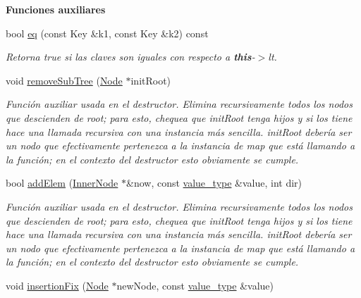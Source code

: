 \begin{Indent}{\bf Funciones auxiliares}\par
\begin{DoxyCompactItemize}
\item 
bool \hyperlink{classaed2_1_1map_ab45cb28bb215cd229383d88b96b3f624_ab45cb28bb215cd229383d88b96b3f624}{eq} (const Key \&k1, const Key \&k2) const 
\begin{DoxyCompactList}\small\item\em Retorna true si las claves son iguales con respecto a {\bfseries this}-\/$>$lt. \end{DoxyCompactList}\item 
void \hyperlink{classaed2_1_1map_a533bd88d0b7a584e3c968548d246c255_a533bd88d0b7a584e3c968548d246c255}{remove\+Sub\+Tree} (\hyperlink{structaed2_1_1map_1_1Node}{Node} $\ast$init\+Root)
\begin{DoxyCompactList}\small\item\em Función auxiliar usada en el destructor. Elimina recursivamente todos los nodos que descienden de root; para esto, chequea que init\+Root tenga hijos y si los tiene hace una llamada recursiva con una instancia más sencilla. init\+Root debería ser un nodo que efectivamente pertenezca a la instancia de map que está llamando a la función; en el contexto del destructor esto obviamente se cumple. \end{DoxyCompactList}\item 
bool \hyperlink{classaed2_1_1map_a010a17bb041f4b1dfc22246920cde9ee_a010a17bb041f4b1dfc22246920cde9ee}{add\+Elem} (\hyperlink{structaed2_1_1map_1_1InnerNode}{Inner\+Node} $\ast$\&now, const \hyperlink{classaed2_1_1map_a719db98e0ff9a837610f76be33264680_a719db98e0ff9a837610f76be33264680}{value\+\_\+type} \&value, int dir)
\begin{DoxyCompactList}\small\item\em Función auxiliar usada en el destructor. Elimina recursivamente todos los nodos que descienden de root; para esto, chequea que init\+Root tenga hijos y si los tiene hace una llamada recursiva con una instancia más sencilla. init\+Root debería ser un nodo que efectivamente pertenezca a la instancia de map que está llamando a la función; en el contexto del destructor esto obviamente se cumple. \end{DoxyCompactList}\item 
void \hyperlink{classaed2_1_1map_abe3f47a745e17a6327943b813ff6bfb3_abe3f47a745e17a6327943b813ff6bfb3}{insertion\+Fix} (\hyperlink{structaed2_1_1map_1_1Node}{Node} $\ast$new\+Node, const \hyperlink{classaed2_1_1map_a719db98e0ff9a837610f76be33264680_a719db98e0ff9a837610f76be33264680}{value\+\_\+type} \&value)

\end{DoxyCompactItemize}
\end{Indent}
